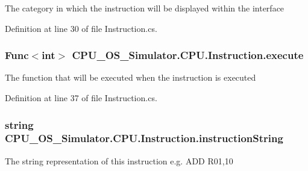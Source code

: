 The category in which the instruction will be displayed within the interface 



Definition at line 30 of file Instruction.\+cs.

\hypertarget{class_c_p_u___o_s___simulator_1_1_c_p_u_1_1_instruction_ae6c5e3409f33f49c745ab57ca9a885a9}{}
\subsubsection[{execute}]{\setlength{\rightskip}{0pt plus 5cm}Func$<$int$>$ C\+P\+U\+\_\+\+O\+S\+\_\+\+Simulator.\+C\+P\+U.\+Instruction.\+execute\hspace{0.3cm}{\ttfamily [private]}}\label{class_c_p_u___o_s___simulator_1_1_c_p_u_1_1_instruction_ae6c5e3409f33f49c745ab57ca9a885a9}


The function that will be executed when the instruction is executed 



Definition at line 37 of file Instruction.\+cs.

\hypertarget{class_c_p_u___o_s___simulator_1_1_c_p_u_1_1_instruction_ab58373ca153de047b36c1036e07db7a8}{}
\subsubsection[{instruction\+String}]{\setlength{\rightskip}{0pt plus 5cm}string C\+P\+U\+\_\+\+O\+S\+\_\+\+Simulator.\+C\+P\+U.\+Instruction.\+instruction\+String\hspace{0.3cm}{\ttfamily [private]}}\label{class_c_p_u___o_s___simulator_1_1_c_p_u_1_1_instruction_ab58373ca153de047b36c1036e07db7a8}


The string representation of this instruction e.\+g. A\+D\+D R01,10 



